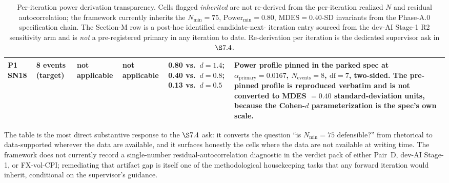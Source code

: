 \begin{table}[h]
\begin{tabular}{@{}p{2.7cm} p{1.3cm} p{1.5cm} p{1.4cm} p{1.6cm} p{4.2cm}@{}}
\addlinespace
P1 SN18               & 8 events (target) & not applicable & not applicable & 0.80 vs.\ \(d = 1.4\); 0.40 vs.\ \(d = 0.8\); 0.13 vs.\ \(d = 0.5\) & Power profile pinned in the parked spec at \(\alpha_{\mathrm{primary}} = 0.0167\), \(N_{\mathrm{events}} = 8\), \(\mathrm{df} = 7\), two-sided. The pre-pinned profile is reproduced verbatim and is not converted to MDES \(= 0.40\) standard-deviation units, because the Cohen-\(d\) parameterization is the spec's own scale. \\
\bottomrule
\end{tabular}
\caption{Per-iteration power derivation transparency. Cells flagged
\emph{inherited} are not re-derived from the per-iteration realized
\(N\) and residual autocorrelation; the framework currently inherits
the \(N_{\min} = 75\), \(\mathrm{Power}_{\min} = 0.80\),
\(\mathrm{MDES} = 0.40\)-SD invariants from the Phase-A.0 specification
chain. The Section-M row is a post-hoc identified candidate-next-
iteration entry sourced from the dev-AI Stage-1 R2 sensitivity arm and
is \emph{not} a pre-registered primary in any iteration to date.
Re-derivation per iteration is the dedicated supervisor ask in
\(\S 7.4\).}\label{tab:powerD}
\end{table}

The table is the most direct substantive response to the
\(\S 7.4\) ask: it converts the question ``is \(N_{\min} = 75\)
defensible?'' from rhetorical to data-supported wherever the
data are available, and it surfaces honestly the cells where the data
are not available at writing time. The framework does not currently
record a single-number residual-autocorrelation diagnostic in the
verdict pack of either Pair~D, dev-AI Stage-1, or FX-vol-CPI;
remediating that artifact gap is itself one of the methodological
housekeeping tasks that any forward iteration would inherit,
conditional on the supervisor's guidance.

